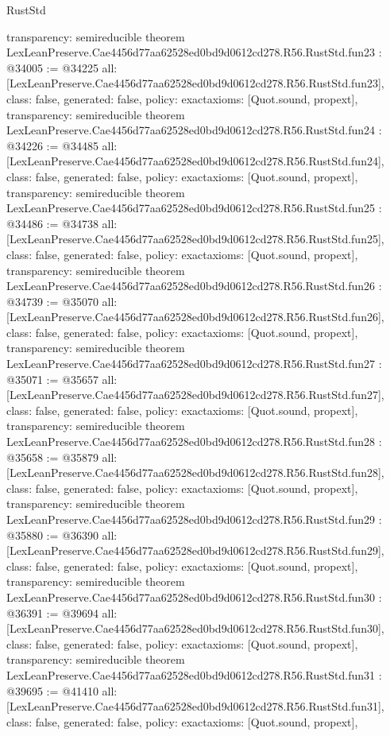 \begin{lexlean}{RustStd}
\begin{coremodule}
{  transparency: semireducible
}
theorem LexLeanPreserve.Cae4456d77aa62528ed0bd9d0612cd278.R56.RustStd.fun23 : @34005 := @34225 {
  all: [LexLeanPreserve.Cae4456d77aa62528ed0bd9d0612cd278.R56.RustStd.fun23],
  class: false,
  generated: false,
  policy: exact{axioms: [Quot.sound, propext]},
  transparency: semireducible
}
theorem LexLeanPreserve.Cae4456d77aa62528ed0bd9d0612cd278.R56.RustStd.fun24 : @34226 := @34485 {
  all: [LexLeanPreserve.Cae4456d77aa62528ed0bd9d0612cd278.R56.RustStd.fun24],
  class: false,
  generated: false,
  policy: exact{axioms: [Quot.sound, propext]},
  transparency: semireducible
}
theorem LexLeanPreserve.Cae4456d77aa62528ed0bd9d0612cd278.R56.RustStd.fun25 : @34486 := @34738 {
  all: [LexLeanPreserve.Cae4456d77aa62528ed0bd9d0612cd278.R56.RustStd.fun25],
  class: false,
  generated: false,
  policy: exact{axioms: [Quot.sound, propext]},
  transparency: semireducible
}
theorem LexLeanPreserve.Cae4456d77aa62528ed0bd9d0612cd278.R56.RustStd.fun26 : @34739 := @35070 {
  all: [LexLeanPreserve.Cae4456d77aa62528ed0bd9d0612cd278.R56.RustStd.fun26],
  class: false,
  generated: false,
  policy: exact{axioms: [Quot.sound, propext]},
  transparency: semireducible
}
theorem LexLeanPreserve.Cae4456d77aa62528ed0bd9d0612cd278.R56.RustStd.fun27 : @35071 := @35657 {
  all: [LexLeanPreserve.Cae4456d77aa62528ed0bd9d0612cd278.R56.RustStd.fun27],
  class: false,
  generated: false,
  policy: exact{axioms: [Quot.sound, propext]},
  transparency: semireducible
}
theorem LexLeanPreserve.Cae4456d77aa62528ed0bd9d0612cd278.R56.RustStd.fun28 : @35658 := @35879 {
  all: [LexLeanPreserve.Cae4456d77aa62528ed0bd9d0612cd278.R56.RustStd.fun28],
  class: false,
  generated: false,
  policy: exact{axioms: [Quot.sound, propext]},
  transparency: semireducible
}
theorem LexLeanPreserve.Cae4456d77aa62528ed0bd9d0612cd278.R56.RustStd.fun29 : @35880 := @36390 {
  all: [LexLeanPreserve.Cae4456d77aa62528ed0bd9d0612cd278.R56.RustStd.fun29],
  class: false,
  generated: false,
  policy: exact{axioms: [Quot.sound, propext]},
  transparency: semireducible
}
theorem LexLeanPreserve.Cae4456d77aa62528ed0bd9d0612cd278.R56.RustStd.fun30 : @36391 := @39694 {
  all: [LexLeanPreserve.Cae4456d77aa62528ed0bd9d0612cd278.R56.RustStd.fun30],
  class: false,
  generated: false,
  policy: exact{axioms: [Quot.sound, propext]},
  transparency: semireducible
}
theorem LexLeanPreserve.Cae4456d77aa62528ed0bd9d0612cd278.R56.RustStd.fun31 : @39695 := @41410 {
  all: [LexLeanPreserve.Cae4456d77aa62528ed0bd9d0612cd278.R56.RustStd.fun31],
  class: false,
  generated: false,
  policy: exact{axioms: [Quot.sound, propext]},
}
\end{coremodule}
\end{lexlean}
